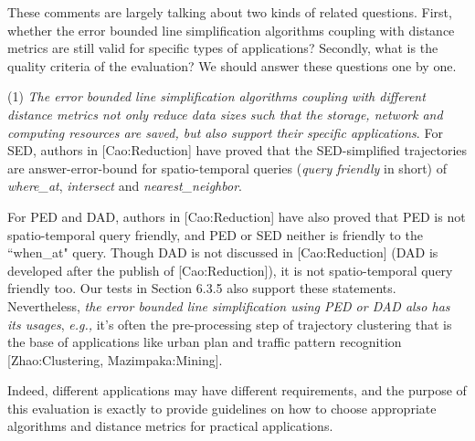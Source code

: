\documentclass{letter}
\newcommand{\ie}{\emph{i.e.,}\xspace}
\newcommand{\eg}{\emph{e.g.,}\xspace}
\begin{document}
These comments are largely talking about two kinds of related questions. First, whether the error bounded line simplification algorithms coupling with distance metrics are still valid for specific types of applications? Secondly, what is the quality criteria of the evaluation? We should answer these questions one by one.

(1) \emph{The error bounded line simplification algorithms coupling with different distance metrics not only reduce data sizes such that the storage, network and computing resources are saved, but also support their specific applications}. For SED, authors in [Cao:Reduction] have proved that the SED-simplified trajectories are answer-error-bound for spatio-temporal queries (\emph{query friendly} in short) of \emph{where\_at}, \emph{intersect} and \emph{nearest\_neighbor}.  %

For PED and DAD, authors in [Cao:Reduction] have also proved that PED is not spatio-temporal query friendly, and PED or SED neither is friendly to the ``when\_at" query. Though DAD is not discussed in [Cao:Reduction] (DAD is developed after the publish of [Cao:Reduction]), it is not spatio-temporal query friendly too. Our tests in Section 6.3.5 also support these statements. Nevertheless, \emph{the error bounded line simplification using PED or DAD also has its usages}, \eg it's often the pre-processing step of trajectory clustering that is the base of applications like urban plan and traffic pattern recognition [Zhao:Clustering, Mazimpaka:Mining]. %


Indeed, different applications may have different requirements, and the purpose of this evaluation is exactly to provide guidelines on how to choose appropriate algorithms and distance metrics for practical applications.
\end{document}
